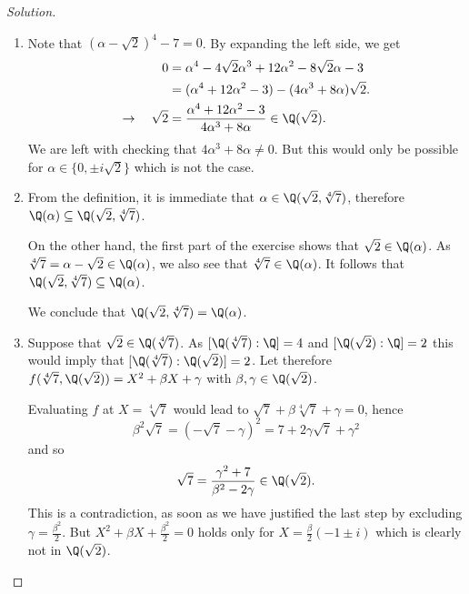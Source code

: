 \documentclass[a4paper,10pt,reqno]{amsart}
\newenvironment{sol}
  {\renewcommand\qedsymbol{$\blacksquare$}\begin{proof}[Solution]}
  {\end{proof}}
\begin{document}
\begin{sol}~

    \begin{enumerate}[label=(\roman*)]
        \item Note that $(\alpha - \sqrt{2})^4 -7 = 0$. By expanding the left side, we get
        \begin{align*}
            0 &= \alpha^4 - 4\sqrt{2}\alpha^3 + 12 \alpha^2 - 8\sqrt{2}\alpha - 3 \\
            & = (\alpha^4 + 12\alpha^2 - 3) -  (4 \alpha^3 + 8 \alpha )\sqrt{2}. \\
            \rightarrow \quad \sqrt{2} & = \frac{\alpha^4 + 12\alpha^2 - 3}{4 \alpha^3 + 8 \alpha} \in \Q(\sqrt{2}).
        \end{align*}
        We are left with checking that $4 \alpha^3 + 8 \alpha \neq 0$. But this would only be possible for $\alpha \in \{ 0, \pm i\sqrt{2} \}$ which is not the case.
        \item From the definition, it is immediate that $\alpha \in \Q(\sqrt{2} , \sqrt[4]{7})$, therefore $\Q(\alpha) \subseteq \Q(\sqrt{2} , \sqrt[4]{7})$.

        On the other hand, the first part of the exercise shows that $\sqrt{2} \in \Q(\alpha)$. As $\sqrt[4]{7} = \alpha - \sqrt{2} \in \Q(\alpha)$, we also see that $\sqrt[4]{7} \in \Q(\alpha)$. It follows that $\Q(\sqrt{2} , \sqrt[4]{7}) \subseteq \Q(\alpha)$.

        We conclude that $\Q(\sqrt{2} , \sqrt[4]{7}) = \Q(\alpha)$.

        \item Suppose that $\sqrt{2} \in \Q(\sqrt[4]{7})$. As $[\Q(\sqrt[4]{7}):\Q] = 4$ and $[\Q(\sqrt{2}):\Q] = 2$ this would imply that $[\Q(\sqrt[4]{7}):\Q(\sqrt{2})] = 2$. Let therefore $f(\sqrt[4]{7},\Q(\sqrt{2})) = X^2 + \beta X + \gamma$ with $\beta, \gamma \in \Q(\sqrt{2})$. 
        
        Evaluating $f$ at $X = \sqrt[4]{7}$ would lead to $\sqrt{7} + \beta \sqrt[4]{7} + \gamma = 0 $,
        hence
        \[
        \beta^2 \sqrt{7}  = (- \sqrt{7} - \gamma)^2= 7 + 2\gamma \sqrt{7}  + \gamma^2 
        \]
        and so
        \[
        \sqrt{7}  = \frac{\gamma^2 + 7}{\beta^2 - 2 \gamma} \in \Q(\sqrt{2}).
        \]
        This is a contradiction, as soon as we have justified the last step by excluding $\gamma = \frac{\beta^2}{2}$. But $X^2 + \beta X + \frac{\beta^2}{2} = 0$ holds only for $X =\frac{\beta}{2} (-1 \pm i)$ which is clearly not in $\Q(\sqrt{2})$.


\end{enumerate}
\end{sol}
\end{document}
